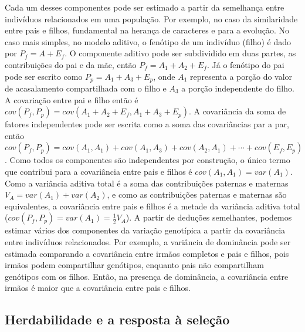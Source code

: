 \begin{refsection}
Cada um desses componentes pode ser estimado a partir da semelhança entre
indivíduos relacionados em uma população. Por exemplo, no caso da similaridade
entre pais e filhos, fundamental na herança de caracteres e para a evolução.
No caso mais simples, no modelo aditivo, o fenótipo de um indivíduo (filho) é dado por
$P_f = A + E_f$. O componente aditivo pode ser subdividido em duas partes, as
contribuições do pai e da mãe, então $P_f = A_1 + A_2 + E_f$. Já o fenótipo do pai
pode ser escrito como $P_p = A_1 + A_3 + E_p$, onde $A_1$ representa a porção
do valor de acasalamento compartilhada com o filho e $A_3$ a porção
independente do filho. A covariação entre pai e filho então é $cov(P_f, P_p) =
cov(A_1 + A_2 + E_f, A_1 + A_3 + E_p)$. A covariância da soma de fatores
independentes pode ser escrita como a soma das covariâncias par a par, então
$cov(P_f, P_p) = cov(A_1, A_1) + cov(A_1, A_3) + cov(A_2, A_1) + \cdots  +
cov(E_f, E_p)$. Como todos os componentes são independentes por construção, o
único termo que contribui para a covariância entre pais e filhos é $cov(A_1,
A_1) = var(A_1)$. Como a variância aditiva total é a soma das contribuições
paternas e maternas $V_A = var(A_1) + var(A_2)$, e como as contribuições
paternas e maternas são equivalentes, a covariância entre pais e filhos é a
metade da variância aditiva total ($cov(P_f, P_p) = var(A_1) = \frac{1}{2}V_A$).
A partir de deduções semelhantes, podemos estimar vários dos componentes da
variação genotípica a partir da covariância entre indivíduos relacionados. Por
exemplo, a variância de dominância pode ser estimada comparando a covariância
entre irmãos completos e pais e filhos, pois irmãos podem compartilhar
genótipos, enquanto pais não compartilham genótipos com os filhos. Então, na
presença de dominância, a covariância entre irmãos é maior que a covariância
entre pais e filhos.

\subsection{Herdabilidade e a resposta à seleção}


\end{refsection}
